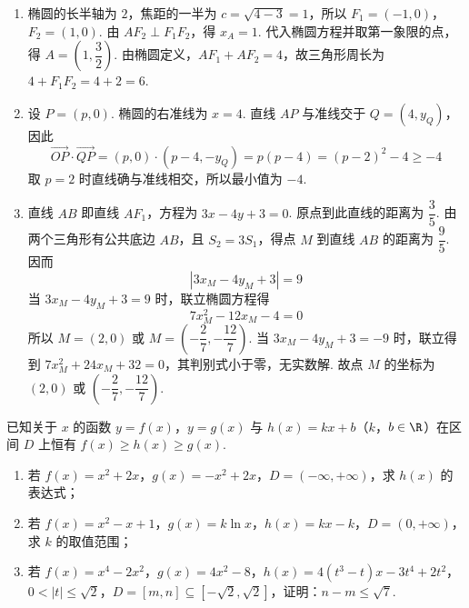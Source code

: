 \begin{solution}
\begin{enumerate}
\item 椭圆的长半轴为 \(2\)，焦距的一半为 \(c=\sqrt{4-3}=1\)，所以 \(F_1=(-1,0)\)，\(F_2=(1,0)\). 由 \(AF_2\perp F_1F_2\)，得 \(x_A=1\). 代入椭圆方程并取第一象限的点，得 \(A=\left(1,\dfrac32\right)\). 由椭圆定义，\(AF_1+AF_2=4\)，故三角形周长为 \(4+F_1F_2=4+2=6\).
\item 设 \(P=(p,0)\). 椭圆的右准线为 \(x=4\). 直线 \(AP\) 与准线交于 \(Q=(4,y_Q)\)，因此
\[
\overrightarrow{OP}\cdot\overrightarrow{QP}=(p,0)\cdot(p-4,-y_Q)=p(p-4)=(p-2)^2-4\geq-4
\]
取 \(p=2\) 时直线确与准线相交，所以最小值为 \(-4\).
\item 直线 \(AB\) 即直线 \(AF_1\)，方程为 \(3x-4y+3=0\). 原点到此直线的距离为 \(\dfrac35\). 由两个三角形有公共底边 \(AB\)，且 \(S_2=3S_1\)，得点 \(M\) 到直线 \(AB\) 的距离为 \(\dfrac95\). 因而
\[
\left|3x_M-4y_M+3\right|=9
\]
当 \(3x_M-4y_M+3=9\) 时，联立椭圆方程得
\[
7x_M^2-12x_M-4=0
\]
所以 \(M=(2,0)\) 或 \(M=\left(-\dfrac27,-\dfrac{12}{7}\right)\). 当 \(3x_M-4y_M+3=-9\) 时，联立得到 \(7x_M^2+24x_M+32=0\)，其判别式小于零，无实数解. 故点 \(M\) 的坐标为 \((2,0)\) 或 \(\left(-\dfrac27,-\dfrac{12}{7}\right)\).
\end{enumerate}
\end{solution}

\begin{problem}
已知关于 \(x\) 的函数 \(y=f(x)\)，\(y=g(x)\) 与 \(h(x)=kx+b\)（\(k\)，\(b\in\R\)）在区间 \(D\) 上恒有 \(f(x)\ge h(x)\ge g(x)\).

\begin{enumerate}
\item 若 \(f(x)=x^2+2x\)，\(g(x)=-x^2+2x\)，\(D=(-\infty,+\infty)\)，求 \(h(x)\) 的表达式；
\item 若 \(f(x)=x^2-x+1\)，\(g(x)=k\ln x\)，\(h(x)=kx-k\)，\(D=(0,+\infty)\)，求 \(k\) 的取值范围；
\item 若 \(f(x)=x^4-2x^2\)，\(g(x)=4x^2-8\)，\(h(x)=4(t^3-t)x-3t^4+2t^2\)，\(0<|t|\le\sqrt2\)，\(D=[m,n]\subseteq[-\sqrt2,\sqrt2]\)，证明：\(n-m\le\sqrt7\).
\end{enumerate}
\end{problem}

